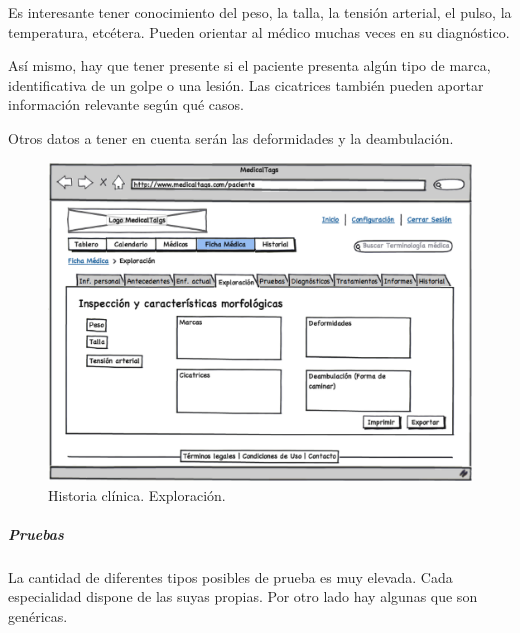 			Es interesante tener conocimiento del peso, la talla, la tensión arterial, el pulso, la temperatura, etcétera. Pueden orientar al médico muchas veces en su diagnóstico.
			
			Así mismo, hay que tener presente si el paciente presenta algún tipo de marca, identificativa de un golpe o una lesión. Las cicatrices también pueden aportar información relevante según qué casos.
			
			Otros datos a tener en cuenta serán las deformidades y la deambulación.
			
			
			
			\begin{figure}[H]
			  \centering
			    \includegraphics[width=12cm]{img/eps/33_Exploracion_paciente.eps}
			  \caption{Historia clínica. Exploración.}
			  \label{fig:exploracion}
			\end{figure}
			
		
		\bigskip
		\bigskip
		\bigskip
		\subparagraph{Pruebas} %
		\label{par:interface_pruebas}
			
			La cantidad de diferentes tipos posibles de prueba es muy elevada. Cada especialidad dispone de las suyas propias. Por otro lado hay algunas que son genéricas.
			
